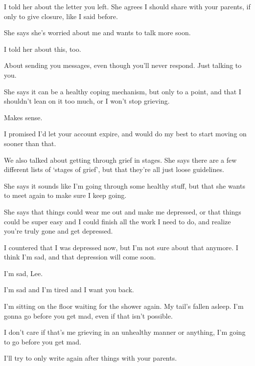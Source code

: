 { I told her about the letter you left. She agrees I should share with your parents, if only to give closure, like I said before.

 She says she's worried about me and wants to talk more soon.

 I told her about this, too.

 About sending you messages, even though you'll never respond. Just talking to you.

 She says it can be a healthy coping mechanism, but only to a point, and that I shouldn't lean on it too much, or I won't stop grieving.

 Makes sense.

 I promised I'd let your account expire, and would do my best to start moving on sooner than that.

 We also talked about getting through grief in stages. She says there are a few different lists of `stages of grief', but that they're all just loose guidelines.

 She says it sounds like I'm going through some healthy stuff, but that she wants to meet again to make sure I keep going.

 She says that things could wear me out and make me depressed, or that things could be super easy and I could finish all the work I need to do, and realize you're truly gone and get depressed.

 I countered that I was depressed now, but I'm not sure about that anymore. I think I'm sad, and that depression will come soon.

 I'm sad, Lee.

 I'm sad and I'm tired and I want you back.

 I'm sitting on the floor waiting for the shower again. My tail's fallen asleep. I'm gonna go before you get mad, even if that isn't possible.

 I don't care if that's me grieving in an unhealthy manner or anything, I'm going to go before you get mad.

 I'll try to only write again after things with your parents.

}
